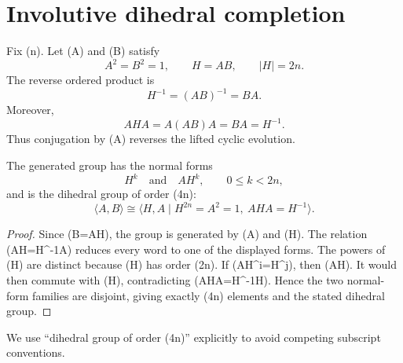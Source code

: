 \section{Involutive dihedral completion}

Fix (n). Let (A) and (B) satisfy
\[
A^2=B^2=1,
\qquad
H=AB,
\qquad
|H|=2n.
\]
The reverse ordered product is
\[
H^{-1}=(AB)^{-1}=BA.
\]
Moreover,
\[
AHA=A(AB)A=BA=H^{-1}.
\]
Thus conjugation by (A) reverses the lifted cyclic evolution.

\begin{proposition}
The generated group has the normal forms
\[
H^k
\quad\text{and}\quad
AH^k,
\qquad 0\leq k<2n,
\]
and is the dihedral group of order (4n):
\[
\langle A,B\rangle
\cong
\langle H,A\mid H^{2n}=A^2=1,\ AHA=H^{-1}\rangle.
\]
\end{proposition}

\begin{proof}
Since (B=AH), the group is generated by (A) and (H). The relation
(AH=H^{-1}A) reduces every word to one of the displayed forms. The powers
of (H) are distinct because (H) has order (2n). If
(AH^i=H^j), then (A\in\langle H\rangle). It would then commute with (H),
contradicting (AHA=H^{-1}\neq H). Hence the two normal-form families are
disjoint, giving exactly (4n) elements and the stated dihedral group.
\end{proof}

We use ``dihedral group of order (4n)'' explicitly to avoid competing
subscript conventions.


